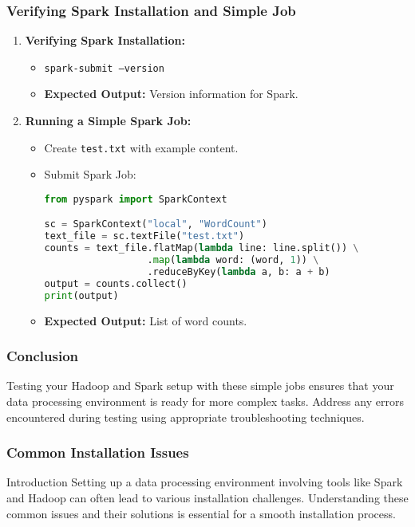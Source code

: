 \documentclass{beamer}
\begin{document}
\begin{frame}[fragile]
    \frametitle{Verifying Spark Installation and Simple Job}
    \begin{enumerate}[resume]
        \item \textbf{Verifying Spark Installation:}
        \begin{itemize}
            \item \texttt{spark-submit --version}
            \item \textbf{Expected Output:} Version information for Spark.
        \end{itemize}

        \item \textbf{Running a Simple Spark Job:}
        \begin{itemize}
            \item Create \texttt{test.txt} with example content.
            \item Submit Spark Job:
            \begin{lstlisting}[language=Python]
from pyspark import SparkContext

sc = SparkContext("local", "WordCount")
text_file = sc.textFile("test.txt")
counts = text_file.flatMap(lambda line: line.split()) \
                  .map(lambda word: (word, 1)) \
                  .reduceByKey(lambda a, b: a + b)
output = counts.collect()
print(output)
            \end{lstlisting}
            \item \textbf{Expected Output:} List of word counts.
        \end{itemize}
    \end{enumerate}
\end{frame}

\begin{frame}
    \frametitle{Conclusion}
    Testing your Hadoop and Spark setup with these simple jobs ensures that your data processing environment is ready for more complex tasks. Address any errors encountered during testing using appropriate troubleshooting techniques.
\end{frame}

\begin{frame}
    \frametitle{Common Installation Issues}
    \begin{block}{Introduction}
        Setting up a data processing environment involving tools like Spark and Hadoop can often lead to various installation challenges. Understanding these common issues and their solutions is essential for a smooth installation process.
    \end{block}
\end{frame}
\end{document}
